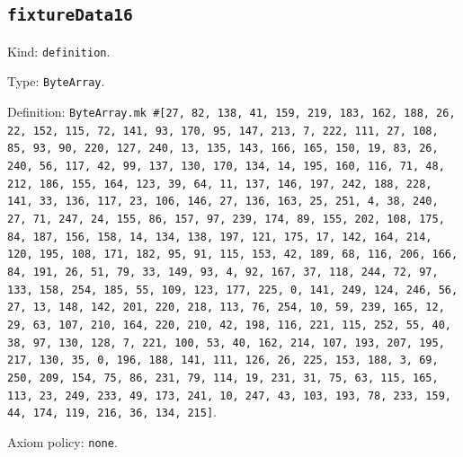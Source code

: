 \documentclass[11pt]{article}
\begin{document}
\subsection*{\texttt{fixtureData16}}
\noindent Kind: \texttt{definition}.\par
\noindent Type: \texttt{ByteArray}.\par
\noindent Definition: \texttt{ByteArray.mk \#[27, 82, 138, 41, 159, 219, 183, 162, 188, 26, 22, 152, 115, 72, 141, 93, 170, 95, 147, 213, 7, 222, 111, 27, 108, 85, 93, 90, 220, 127, 240, 13, 135, 143, 166, 165, 150, 19, 83, 26, 240, 56, 117, 42, 99, 137, 130, 170, 134, 14, 195, 160, 116, 71, 48, 212, 186, 155, 164, 123, 39, 64, 11, 137, 146, 197, 242, 188, 228, 141, 33, 136, 117, 23, 106, 146, 27, 136, 163, 25, 251, 4, 38, 240, 27, 71, 247, 24, 155, 86, 157, 97, 239, 174, 89, 155, 202, 108, 175, 84, 187, 156, 158, 14, 134, 138, 197, 121, 175, 17, 142, 164, 214, 120, 195, 108, 171, 182, 95, 91, 115, 153, 42, 189, 68, 116, 206, 166, 84, 191, 26, 51, 79, 33, 149, 93, 4, 92, 167, 37, 118, 244, 72, 97, 133, 158, 254, 185, 55, 109, 123, 177, 225, 0, 141, 249, 124, 246, 56, 27, 13, 148, 142, 201, 220, 218, 113, 76, 254, 10, 59, 239, 165, 12, 29, 63, 107, 210, 164, 220, 210, 42, 198, 116, 221, 115, 252, 55, 40, 38, 97, 130, 128, 7, 221, 100, 53, 40, 162, 214, 107, 193, 207, 195, 217, 130, 35, 0, 196, 188, 141, 111, 126, 26, 225, 153, 188, 3, 69, 250, 209, 154, 75, 86, 231, 79, 114, 19, 231, 31, 75, 63, 115, 165, 113, 23, 249, 233, 49, 173, 241, 10, 247, 43, 103, 193, 78, 233, 159, 44, 174, 119, 216, 36, 134, 215]}.\par
\noindent Axiom policy: \texttt{none}.\par
\end{document}
